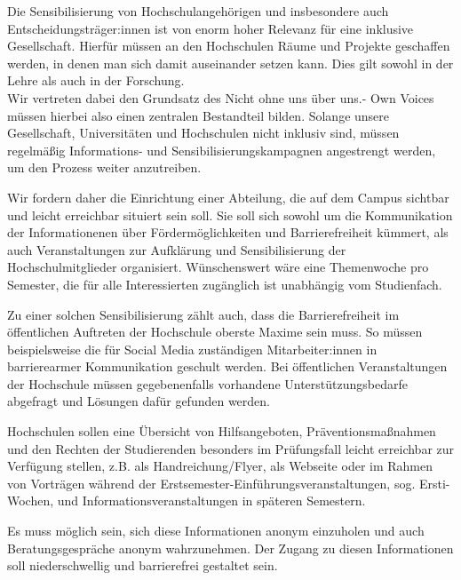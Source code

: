 \documentclass[DIV=calc]{scrartcl}
\let\oldgrqq=\grqq
\def\grqq{\oldgrqq\xspace}
\begin{document}
Die Sensibilisierung von Hochschulangehörigen und insbesondere auch Entscheidungsträger:innen ist von enorm hoher Relevanz für eine inklusive Gesellschaft. Hierfür müssen an den Hochschulen Räume und Projekte geschaffen werden, in denen man sich damit auseinander setzen kann. Dies gilt sowohl in der Lehre als auch in der Forschung.\\
Wir vertreten dabei den Grundsatz des \glqq Nicht ohne uns über uns.\grqq - Own Voices müssen hierbei also einen zentralen Bestandteil bilden. Solange unsere Gesellschaft, Universitäten und Hochschulen nicht inklusiv sind, müssen regelmäßig Informations- und Sensibilisierungskampagnen angestrengt werden, um den Prozess weiter anzutreiben.
   
Wir fordern daher die Einrichtung einer Abteilung, die auf dem Campus sichtbar und leicht erreichbar situiert sein soll. Sie soll sich sowohl um die Kommunikation der  Informationenen über Fördermöglichkeiten und Barrierefreiheit kümmert, als auch Veranstaltungen zur Aufklärung und Sensibilisierung der Hochschulmitglieder organisiert. Wünschenswert wäre eine Themenwoche pro Semester, die für alle Interessierten zugänglich ist unabhängig vom Studienfach. 

Zu einer solchen Sensibilisierung zählt auch, dass die Barrierefreiheit im öffentlichen Auftreten der Hochschule oberste Maxime sein muss. So müssen beispielsweise die für Social Media zuständigen Mitarbeiter:innen in barrierearmer Kommunikation geschult werden. Bei öffentlichen Veranstaltungen der Hochschule müssen gegebenenfalls vorhandene Unterstützungsbedarfe abgefragt und Lösungen dafür gefunden werden.

Hochschulen sollen eine Übersicht von Hilfsangeboten, Präventionsmaßnahmen und den Rechten der Studierenden besonders im Prüfungsfall leicht erreichbar zur Verfügung stellen, z.B. als Handreichung/Flyer, als Webseite oder im Rahmen von Vorträgen während der Erstsemester-Einführungsveranstaltungen, sog. \glqq Ersti-Wochen\grqq, und Informationsveranstaltungen in späteren Semestern. 

Es muss möglich sein, sich diese Informationen anonym einzuholen und auch Beratungsgespräche anonym wahrzunehmen. Der Zugang zu diesen Informationen soll niederschwellig und barrierefrei gestaltet sein. 
\end{document}
